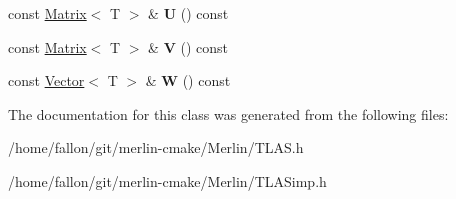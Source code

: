 \begin{DoxyCompactItemize}
\item 
\mbox{\label{classTLAS_1_1SVDMatrix_a77ecbf0121eb051c18d24ecde81f850a}} 
const \hyperlink{classTLAS_1_1Matrix}{Matrix}$<$ T $>$ \& {\bfseries U} () const
\item 
\mbox{\label{classTLAS_1_1SVDMatrix_ae247822e149598d6588cd61d63e6feca}} 
const \hyperlink{classTLAS_1_1Matrix}{Matrix}$<$ T $>$ \& {\bfseries V} () const
\item 
\mbox{\label{classTLAS_1_1SVDMatrix_ab92255983655f3d43a91ec4a1a588b5d}} 
const \hyperlink{classTLAS_1_1Vector}{Vector}$<$ T $>$ \& {\bfseries W} () const
\end{DoxyCompactItemize}


The documentation for this class was generated from the following files\+:\begin{DoxyCompactItemize}
\item 
/home/fallon/git/merlin-\/cmake/\+Merlin/T\+L\+A\+S.\+h\item 
/home/fallon/git/merlin-\/cmake/\+Merlin/T\+L\+A\+Simp.\+h\end{DoxyCompactItemize}
